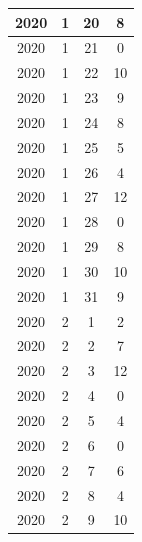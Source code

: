 \begin{table}
\begin{tabular}{|c|c|c|c|}
\hline
2020         & 1            & 20           & 8                           \\ 
\hline
2020         & 1            & 21           & 0                           \\ 
\hline
2020         & 1            & 22           & 10                          \\ 
\hline
2020         & 1            & 23           & 9                           \\ 
\hline
2020         & 1            & 24           & 8                           \\ 
\hline
2020         & 1            & 25           & 5                           \\ 
\hline
2020         & 1            & 26           & 4                           \\ 
\hline
2020         & 1            & 27           & 12                          \\ 
\hline
2020         & 1            & 28           & 0                           \\ 
\hline
2020         & 1            & 29           & 8                           \\ 
\hline
2020         & 1            & 30           & 10                          \\ 
\hline
2020         & 1            & 31           & 9                           \\ 
\hline
2020         & 2            & 1            & 2                           \\ 
\hline
2020         & 2            & 2            & 7                           \\ 
\hline
2020         & 2            & 3            & 12                          \\ 
\hline
2020         & 2            & 4            & 0                           \\ 
\hline
2020         & 2            & 5            & 4                           \\ 
\hline
2020         & 2            & 6            & 0                           \\ 
\hline
2020         & 2            & 7            & 6                           \\ 
\hline
2020         & 2            & 8            & 4                           \\ 
\hline
2020         & 2            & 9            & 10                          \\ 

\end{tabular}
\end{table}
